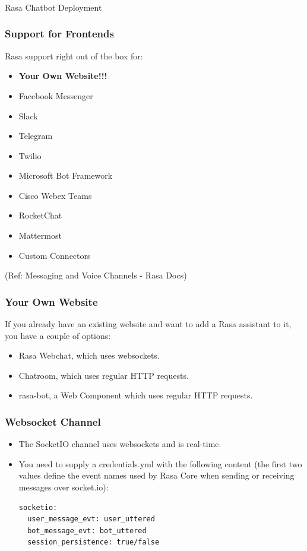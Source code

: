 \begin{frame}[fragile]\frametitle{}
\begin{center}
{\Large Rasa Chatbot Deployment}

\end{center}
\end{frame}


 \begin{frame}[fragile]\frametitle{Support for Frontends}
 Rasa support right out of the box for:
 \begin{itemize}
\item {\bf Your Own Website!!!}
\item Facebook Messenger
\item Slack
\item Telegram
\item Twilio
\item Microsoft Bot Framework
\item Cisco Webex Teams
\item RocketChat
\item Mattermost
\item Custom Connectors
\end{itemize}

{\tiny (Ref: Messaging and Voice Channels - Rasa Docs)}

\end{frame}


 \begin{frame}[fragile]\frametitle{Your Own Website}
 If you already have an existing website and want to add a Rasa assistant to it, you have a couple of options:
 \begin{itemize}
\item Rasa Webchat, which uses websockets.
\item Chatroom, which uses regular HTTP requests.
\item rasa-bot, a Web Component which uses regular HTTP requests.
\end{itemize}

\end{frame} 

 \begin{frame}[fragile]\frametitle{Websocket Channel}
 \begin{itemize}
\item The SocketIO channel uses websockets and is real-time. 
\item You need to supply a credentials.yml with the following content (the first two values define the event names used by Rasa Core when sending or receiving messages over socket.io):
\begin{lstlisting}
socketio:
  user_message_evt: user_uttered
  bot_message_evt: bot_uttered
  session_persistence: true/false
\end{lstlisting}
\end{itemize}

\end{frame} 

